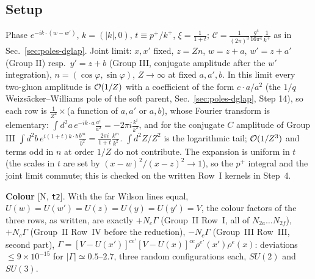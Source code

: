 \subsection{Setup}
\noindent Phase $e^{-ik\cdot(w-w')}$, $k=(|k|,0)$, $t\equiv p^{+}/k^{+}$, $\xi=\frac{1}{1+t}$; $\mathcal{C}=\frac{1}{(2\pi)^{3}}\frac{g^{4}}{16\pi^{4}}\frac{1}{k^{+}}$ as in Sec.~\ref{sec:poles-dglap}. Joint limit: $x,x'$ fixed, $z=Zn$, $w=z+a$, $w'=z+a'$ (Group II) resp.\ $y'=z+b$ (Group III, conjugate amplitude after the $w'$ integration), $n=(\cos\varphi,\sin\varphi)$, $Z\to\infty$ at fixed $a,a',b$. In this limit every two-gluon amplitude is ${\cal O}(1/Z)$ with a coefficient of the form $c\cdot a/a^{2}$ (the $1/q$ Weizs\"acker--Williams pole of the soft parent, Sec.~\ref{sec:poles-dglap}, Step 14), so each row is $\frac{1}{Z^{2}}\times$(a function of $a,a'$ or $a,b$), whose Fourier transform is elementary: $\int d^{2}a\,e^{-ik\cdot a}\frac{a^{i}}{a^{2}}=-2\pi i\frac{k^{i}}{k^{2}}$, and for the conjugate $C$ amplitude of Group III $\int d^{2}b\,e^{i(1+t)k\cdot b}\frac{b^{m}}{b^{2}}=\frac{2\pi i}{1+t}\frac{k^{m}}{k^{2}}$. $\int d^{2}Z/Z^{2}$ is the logarithmic tail; ${\cal O}(1/Z^{3})$ and terms odd in $n$ at order $1/Z$ do not contribute. The expansion is uniform in $t$ (the scales in $t$ are set by $(x-w)^{2}/(x-z)^{2}\to1$), so the $p^{+}$ integral and the joint limit commute; this is checked on the written Row~I kernels in Step~4.

\noindent\textbf{Colour} [N, \texttt{t2}]. With the far Wilson lines equal, $U(w)=U(w')=U(z)=U(y)=U(y')=V$, the colour factors of the three rows, as written, are exactly $+N_{c}\Gamma$ (Group~II Row~I, all of $N_{2a}\dots N_{2f}$), $+N_{c}\Gamma$ (Group~II Row~IV before the reduction), $-N_{c}\Gamma$ (Group~III Row~III, second part), $\Gamma=[V-U(x')]^{ce'}[V-U(x)]^{ce}\rho^{e'}(x')\rho^{e}(x)$: deviations $\le9\times10^{-15}$ for $|\Gamma|\simeq0.5$--$2.7$, three random configurations each, $SU(2)$ and $SU(3)$.

